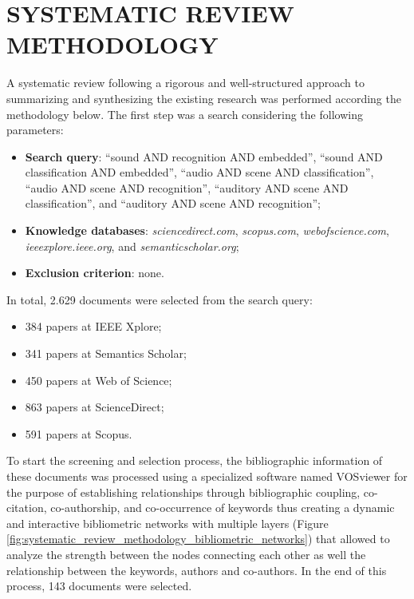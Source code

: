 \chapter{SYSTEMATIC REVIEW METHODOLOGY 
\label{appendix:systematic_review}}

A systematic review following a rigorous and well-structured approach to summarizing and synthesizing the existing research was performed according the methodology below. The first step was a search considering the following parameters:

\begin{itemize}
   \item \textbf{Search query}:  \enquote{sound AND recognition AND embedded}, \enquote{sound AND classification AND embedded}, \enquote{audio AND scene AND classification}, \enquote{audio AND scene AND recognition}, \enquote{auditory AND scene AND classification}, and \enquote{auditory AND scene AND recognition};
   \item \textbf{Knowledge databases}: \textit{sciencedirect.com}, \textit{scopus.com}, \textit{webofscience.com}, \textit{ieeexplore.ieee.org}, and \textit{semanticscholar.org};
   \item \textbf{Exclusion criterion}: none.
\end{itemize}
In total, 2.629 documents were selected from the search query:
\begin{itemize}
    \item{384 papers at IEEE Xplore};
    \item{341 papers at Semantics Scholar};
    \item{450 papers at Web of Science};
    \item{863 papers at ScienceDirect};
    \item{591 papers at Scopus}.
\end{itemize}

To start the screening and selection process, the bibliographic information of these documents was processed using a specialized software named VOSviewer for the purpose of establishing relationships through bibliographic coupling, co-citation, co-authorship, and co-occurrence of keywords thus creating a dynamic and interactive bibliometric networks with multiple layers (Figure \ref{fig:systematic_review_methodology_bibliometric_networks}) that allowed to analyze the strength between the nodes connecting each other as well the relationship between the keywords, authors and co-authors. In the end of this process, 143 documents were selected.

